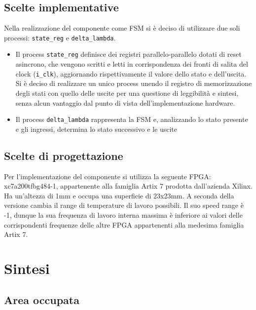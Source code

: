 \documentclass{article}
\begin{document}
\subsection{Scelte implementative}
Nella realizzazione del componente come FSM si è deciso di utilizzare due soli processi: \verb^state_reg^ e \verb^delta_lambda^.
\begin{itemize}
    \item Il process \verb^state_reg^ definisce dei registri parallelo-parallelo dotati di reset asincrono, che vengono scritti e letti in corrispondenza dei fronti di salita del clock (\verb^i_clk^), aggiornando rispettivamente il valore dello stato e dell’uscita. Si è deciso di realizzare un unico process unendo il registro di memorizzazione degli stati con quello delle uscite per una questione di leggibilità e sintesi, senza alcun vantaggio dal punto di vista dell’implementazione hardware.
    \item Il process \verb^delta_lambda^ rappresenta la FSM e, analizzando lo stato presente e gli ingressi, determina lo stato successivo e le uscite
\end{itemize}




\subsection{Scelte di progettazione}
Per l’implementazione del componente si utilizza la seguente FPGA: xc7a200tfbg484-1, appartenente alla famiglia Artix 7 prodotta dall’azienda Xilinx. Ha un’altezza di 1mm e occupa una superficie di 23x23mm. A seconda della versione cambia il range di temperature di lavoro possibili. Il suo speed range è -1, dunque la sua frequenza di lavoro interna massima è inferiore ai valori delle corrispondenti frequenze delle altre FPGA appartenenti alla medesima famiglia Artix 7.







\pagebreak
\section{Sintesi}
\subsection{Area occupata}
\end{document}
